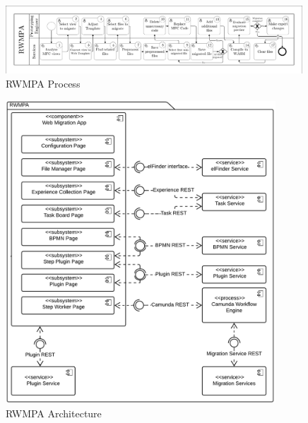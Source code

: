 \begin{appendix}
\begin{figure}
\hypertarget{fig:rwmpa-process}{%
\centering
\includegraphics[width=0.99\textwidth]{../figures/rewamp/rwmpa-process.pdf}
\caption{RWMPA Process}\label{fig:rwmpa-process}
}
\end{figure}

\begin{figure}[h]
\hypertarget{fig:rwmpa-architecture}{%
\centering
\includegraphics[width=0.9\textwidth]{../figures/rewamp/RWMPA-Architecture-NOFONTS.pdf}
\caption{RWMPA Architecture}\label{fig:rwmpa-architecture}
}
\end{figure}


\end{appendix}

